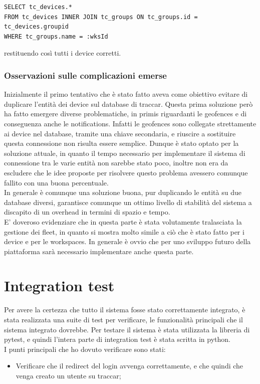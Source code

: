 \documentclass[a4paper,titlepage,12pt]{book}
\begin{document}
{\begin{verbatim}
SELECT tc_devices.* 
FROM tc_devices INNER JOIN tc_groups ON tc_groups.id = tc_devices.groupid 
WHERE tc_groups.name = :wksId
\end{verbatim}

\noindent restituendo così tutti i device corretti.
\subsection{
Osservazioni sulle complicazioni emerse}
Inizialmente il primo tentativo che è stato fatto aveva come obiettivo evitare di duplicare l'entità dei device sul database di traccar. Questa prima soluzione però ha fatto emergere diverse problematiche, in primis riguardanti le geofences e di conseguenza anche le notifications. Infatti le geofences sono collegate strettamente ai device nel database, tramite una chiave secondaria, e riuscire a sostituire questa connessione non risulta essere semplice. Dunque è stato optato per la soluzione attuale, in quanto il tempo necessario per implementare il sistema di connessione tra le varie entità non sarebbe stato poco, inoltre non era da escludere che le idee proposte per risolvere questo problema avessero comunque fallito con una buona percentuale.\\ In generale è comunque una soluzione buona, pur duplicando le entità su due database diversi, garantisce comunque un ottimo livello di stabilità del sistema a discapito di un overhead in termini di spazio e tempo.\\
E' doveroso evidenziare che in questa parte è stata volutamente tralasciata la gestione dei fleet, in quanto si mostra molto simile a ciò che è stato fatto per i device e per le workspaces. In generale è ovvio che per uno sviluppo futuro della piattaforma sarà necessario implementare anche questa parte.


\chapter{
Integration test}
Per avere la certezza che tutto il sistema fosse stato correttamente integrato, è stata realizzata una suite di test per verificare, le funzionalità principali che il sistema integrato dovrebbe. Per testare il sistema è stata utilizzata la libreria di pytest, e quindi l'intera parte di integration test è stata scritta in python.\\
I punti principali che ho dovuto verificare sono stati:
\begin{itemize}
\item Verificare che il redirect del login avvenga correttamente, e che quindi che venga creato un utente su traccar;


\end{itemize}}
\end{document}
